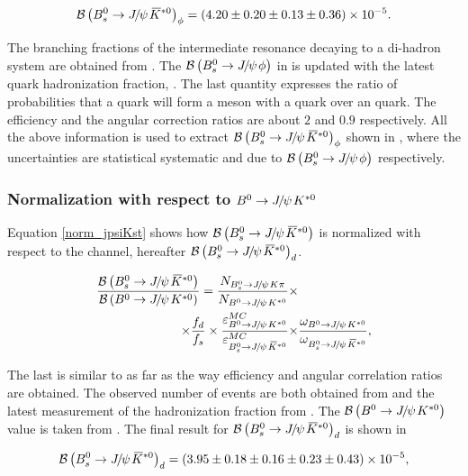 \begin{equation}
  \centering
\BRof\BsJpsiKst_{\phi} = (4.20 \pm 0.20 \pm 0.13 \pm 0.36) \times 10^{-5}.
\label{Br_JpsiPhi}
\end{equation}

\noindent The branching fractions of the intermediate resonance decaying to a di-hadron system are obtained from \cite{PDG}.
The $\BRof\BsJpsiPhi$ in \cite{SheldonKK} is updated with the latest \bquark quark hadronization
fraction, \fdfs \cite{LHCb-CONF-2013-011}. The last quantity expresses the ratio of probabilities that a \bquark quark will form a meson with a
\dquark quark over an \squark quark. The efficiency and the angular correction ratios are about $2$ and $0.9$ respectively.
All the above information is used to extract $\BRof{\BsJpsiKst}_\phi$ shown in , where the uncertainties
are statistical systematic and due to  $\BRof\BsJpsiPhi$ respectively.

\subsubsection{Normalization with respect to $\BdJpsiKst$}
Equation \ref{norm_jpsiKst} shows how $\BRof\BsJpsiKst$ is normalized with respect to the \BdJpsiKst channel, hereafter $\BRof{\BsJpsiKst}_d$.

\begin{align}
  \centering
\frac{\BRof\BsJpsiKst}{\BRof\BdJpsiKst} = \frac{N_{\BsJpsiKpi}}{N_{\BdJpsiKst}} \times & \nonumber \\
                                   \times \fdfs
                                   \times \frac{\varepsilon_{\BdJpsiKst}^{MC}}{\varepsilon_{\BsJpsiKst}^{MC}}
                                   \times &\frac{\omega_{\BdJpsiKst}}{\omega_{\BsJpsiKst}},
\label{norm_jpsiKst}
\end{align}

\noindent The last is similar to  as far as the way efficiency and angular correlation ratios are obtained.
The observed number of events are both obtained from  and the latest measurement of the hadronization
fraction from \cite{LHCb-CONF-2013-011}. The $\BRof\BdJpsiKst$ value is taken from \cite{Abe:2002haa}. The final result for $\BRof{\BsJpsiKst}_d$
is shown in 

\begin{equation}
  \centering
\BRof\BsJpsiKst_{d} = (3.95 \pm 0.18 \pm 0.16 \pm 0.23 \pm 0.43 )\times 10^{-5},
\label{Br_JpsiKst}
\end{equation}

